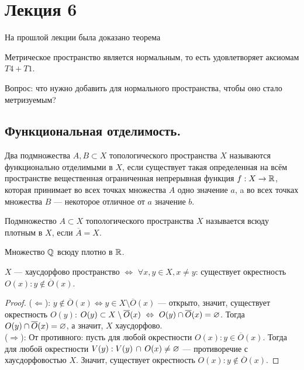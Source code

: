 \section{Лекция 6}

На прошлой лекции была доказано теорема
\begin{theorem}
    Метрическое пространство является нормальным, то есть удовлетворяет аксиомам $T4 + T1$.
\end{theorem}

Вопрос: что нужно добавить для нормального пространства, чтобы оно стало метризуемым?

\subsection{Функциональная отделимость.}

\begin{definition}
    Два подмножества $A, B \subset X$ топологического пространства $X$ называются функционально отделимыми в $X$, если существует такая определенная на всём пространстве вещественная ограниченная непрерывная функция $f: X \to \mathbb{R}$, которая принимает во всех точках множества $A$ одно значение $a$, a во всех точках множества $B$ --- некоторое отличное от $a$ значение $b$.
\end{definition}

\begin{definition}
    Подмножество $A \subset X$ топологического пространства $X$ называется всюду плотным в $X$, если $\overline{A} = X$.
\end{definition}

\begin{example}
    Множество $\mathbb{Q}$ всюду плотно в $\mathbb{R}$.
\end{example}

\begin{statement}
    $X$ --- хаусдорфово пространство $\Longleftrightarrow$ $\forall x, y \in X, x \neq y$: существует окрестность $O(x) : y \notin \overline{O}(x)$.
\end{statement}
\begin{proof}
    ($\Leftarrow$): $y \notin \overline{O}(x) \Leftrightarrow y \in X \setminus \overline{O}(x)$ --- открыто, значит, существует окрестность $O(y)$: $O(y) \subset X \setminus \overline{O}(x) \ \Leftrightarrow \ O(y) \cap \overline{O}(x) = \es$. Тогда $O(y) \cap \overline{O}(x) = \varnothing$, а значит, $X$ хаусдорфово. \\
    ($\Rightarrow$): От противного: пусть для любой окрестности $O(x): y \in \overline{O}(x)$. Тогда для любой окрестности $V(y): V(y) \, \cap \, O(x) \neq \varnothing$ --- противоречие с хаусдорфовостью $X$. Значит, существует окрестность $O(x) : y \notin \overline{O}(x)$.
\end{proof}


